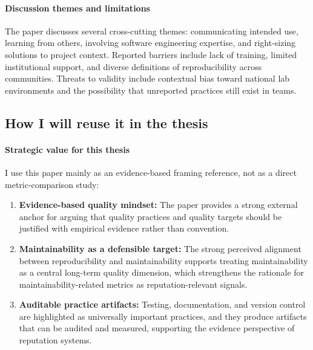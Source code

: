 \documentclass[11pt,a4paper]{article}
\begin{document}
\paragraph{Discussion themes and limitations}
The paper discusses several cross-cutting themes: communicating intended use, learning from others, involving software engineering expertise, and right-sizing solutions to project context. Reported barriers include lack of training, limited institutional support, and diverse definitions of reproducibility across communities. Threats to validity include contextual bias toward national lab environments and the possibility that unreported practices still exist in teams.

\subsection{How I will reuse it in the thesis}
\paragraph{Strategic value for this thesis}
I use this paper mainly as an evidence-based framing reference, not as a direct metric-comparison study:
\begin{enumerate}[leftmargin=*]
  \item \textbf{Evidence-based quality mindset:} The paper provides a strong external anchor for arguing that quality practices and quality targets should be justified with empirical evidence rather than convention.
  \item \textbf{Maintainability as a defensible target:} The strong perceived alignment between reproducibility and maintainability supports treating maintainability as a central long-term quality dimension, which strengthens the rationale for maintainability-related metrics as reputation-relevant signals.
  \item \textbf{Auditable practice artifacts:} Testing, documentation, and version control are highlighted as universally important practices, and they produce artifacts that can be audited and measured, supporting the evidence perspective of reputation systems.
\end{enumerate}
\end{document}
